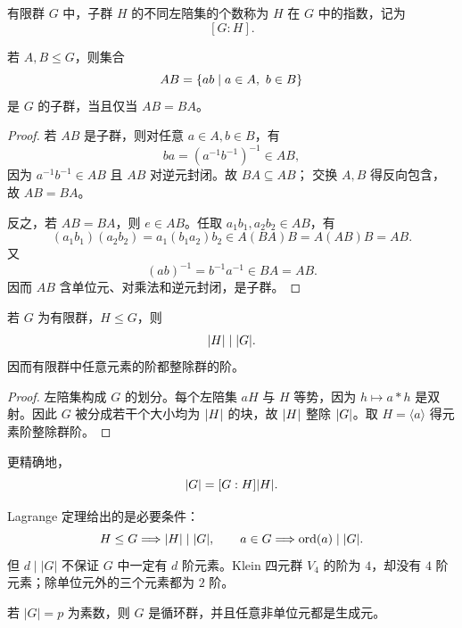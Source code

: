 \begin{definition}[子群的指数]\label{subgroup-index}
  有限群 $G$ 中，子群 $H$ 的不同左陪集的个数称为 $H$ 在 $G$ 中的指数，记为
  \[
  [G:H].
  \]
\end{definition}

\begin{theorem}[子群积判定]\label{subgroup-product-test}
  若 $A,B\le G$，则集合
  \[
  AB=\{ab\mid a\in A,\ b\in B\}
  \]
  是 $G$ 的子群，当且仅当 $AB=BA$。
\end{theorem}

\begin{proof}
  若 $AB$ 是子群，则对任意 $a\in A,b\in B$，有
  \[
  ba=(a^{-1}b^{-1})^{-1}\in AB,
  \]
  因为 $a^{-1}b^{-1}\in AB$ 且 $AB$ 对逆元封闭。故 $BA\subseteq AB$；
  交换 $A,B$ 得反向包含，故 $AB=BA$。

  反之，若 $AB=BA$，则 $e\in AB$。任取 $a_1b_1,a_2b_2\in AB$，有
  \[
  (a_1b_1)(a_2b_2)=a_1(b_1a_2)b_2\in A(BA)B=A(AB)B=AB.
  \]
  又
  \[
  (ab)^{-1}=b^{-1}a^{-1}\in BA=AB.
  \]
  因而 $AB$ 含单位元、对乘法和逆元封闭，是子群。
\end{proof}

\begin{theorem}[Lagrange 定理]\label{lagrange}
  若 $G$ 为有限群，$H\le G$，则
  \[
  \lvert H\rvert\mid \lvert G\rvert.
  \]
  因而有限群中任意元素的阶都整除群的阶。
\end{theorem}

\begin{proof}
  左陪集构成 $G$ 的划分。每个左陪集 $aH$ 与 $H$ 等势，因为 $h\mapsto a*h$ 是双射。因此 $G$ 被分成若干个大小均为 $\lvert H\rvert$ 的块，故 $\lvert H\rvert$ 整除 $\lvert G\rvert$。取 $H=\langle a\rangle$ 得元素阶整除群阶。
\end{proof}

更精确地，
\[
\lvert G\rvert=[G:H]\lvert H\rvert.
\]

\begin{pitfall}\label{lagrange-converse-false}
  Lagrange 定理给出的是必要条件：
  \[
  H\le G\Longrightarrow |H|\mid |G|,\qquad a\in G\Longrightarrow \operatorname{ord}(a)\mid |G|.
  \]
  但 $d\mid |G|$ 不保证 $G$ 中一定有 $d$ 阶元素。Klein 四元群 $V_4$ 的阶为 $4$，却没有 $4$ 阶元素；除单位元外的三个元素都为 $2$ 阶。
\end{pitfall}

\begin{theorem}[素数阶群必为循环群]\label{prime-order-cyclic}
  若 $|G|=p$ 为素数，则 $G$ 是循环群，并且任意非单位元都是生成元。
\end{theorem}

